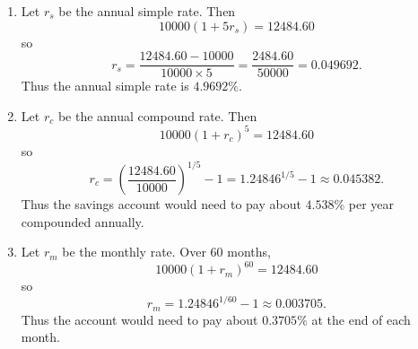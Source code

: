 \documentclass[12pt]{article}
\begin{document}
\begin{enumerate}[label=\textbf{Q\arabic*.}, start=4]
\begin{enumerate}[label=(\alph*)]
\item 
Let \(r_s\) be the annual simple rate. Then
\[
10000(1+5r_s)=12484.60
\]
so
\[
r_s=\frac{12484.60-10000}{10000\times5}
=\frac{2484.60}{50000}
=0.049692.
\]
Thus the annual simple rate is \(4.9692\%\).

\item 
Let \(r_c\) be the annual compound rate. Then
\[
10000(1+r_c)^5=12484.60
\]
so
\[
r_c=\left(\frac{12484.60}{10000}\right)^{1/5}-1
=1.24846^{1/5}-1
\approx0.045382.
\]
Thus the savings account would need to pay about \(4.538\%\) per year compounded annually.

\item 
Let \(r_m\) be the monthly rate. Over 60 months,
\[
10000(1+r_m)^{60}=12484.60
\]
so
\[
r_m=1.24846^{1/60}-1\approx0.003705.
\]
Thus the account would need to pay about \(0.3705\%\) at the end of each month.

\end{enumerate}

\end{enumerate}
\end{document}
